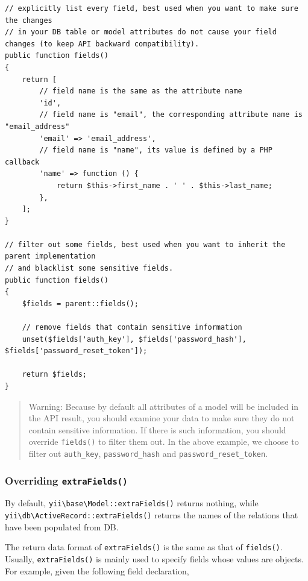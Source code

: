 \lstset{language=php}\begin{lstlisting}
// explicitly list every field, best used when you want to make sure the changes
// in your DB table or model attributes do not cause your field changes (to keep API backward compatibility).
public function fields()
{
    return [
        // field name is the same as the attribute name
        'id',
        // field name is "email", the corresponding attribute name is "email_address"
        'email' => 'email_address',
        // field name is "name", its value is defined by a PHP callback
        'name' => function () {
            return $this->first_name . ' ' . $this->last_name;
        },
    ];
}

// filter out some fields, best used when you want to inherit the parent implementation
// and blacklist some sensitive fields.
public function fields()
{
    $fields = parent::fields();

    // remove fields that contain sensitive information
    unset($fields['auth_key'], $fields['password_hash'], $fields['password_reset_token']);

    return $fields;
}
\end{lstlisting}
\begin{quote}Warning: Because by default all attributes of a model will be included in the API result, you should
examine your data to make sure they do not contain sensitive information. If there is such information,
you should override \lstinline|fields()| to filter them out. In the above example, we choose
to filter out \lstinline|auth_key|, \lstinline|password_hash| and \lstinline|password_reset_token|.

\end{quote}
\subsubsection{Overriding \lstinline|extraFields()| \label{rest-resources.md::overriding-extra-fields}}
By default, \texttt{yii{\allowbreak{}\textbackslash}base{\allowbreak{}\textbackslash}Model\allowbreak{}::\allowbreak{}extraFields()} returns nothing, while \texttt{yii{\allowbreak{}\textbackslash}db{\allowbreak{}\textbackslash}ActiveRecord\allowbreak{}::\allowbreak{}extraFields()}
returns the names of the relations that have been populated from DB.

The return data format of \lstinline|extraFields()| is the same as that of \lstinline|fields()|. Usually, \lstinline|extraFields()|
is mainly used to specify fields whose values are objects. For example, given the following field
declaration,

